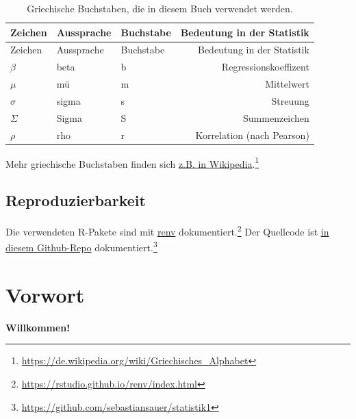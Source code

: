 \documentclass[
  a4paper,
]{scrbook}
\theoremstyle{definition}
\theoremstyle{definition}
\theoremstyle{definition}
\theoremstyle{remark}
\begin{document}
\begin{longtable}[]{@{}lllr@{}}
\caption{Griechische Buchstaben, die in diesem Buch verwendet
werden.}\label{tbl-griech}\tabularnewline
\toprule\noalign{}
Zeichen & Aussprache & Buchstabe & Bedeutung in der Statistik \\
\midrule\noalign{}
\endfirsthead
\toprule\noalign{}
Zeichen & Aussprache & Buchstabe & Bedeutung in der Statistik \\
\midrule\noalign{}
\endhead
\bottomrule\noalign{}
\endlastfoot
\(\beta\) & beta & b & Regressionskoeffizent \\
\(\mu\) & mü & m & Mittelwert \\
\(\sigma\) & sigma & s & Streuung \\
\(\Sigma\) & Sigma & S & Summenzeichen \\
\(\rho\) & rho & r & Korrelation (nach Pearson) \\
\end{longtable}

Mehr griechische Buchstaben finden sich
\href{https://de.wikipedia.org/wiki/Griechisches_Alphabet}{z.B. in
Wikipedia}.\footnote{\url{https://de.wikipedia.org/wiki/Griechisches_Alphabet}}

\section{Reproduzierbarkeit}\label{reproduzierbarkeit}

Die verwendeten R-Pakete sind mit
\href{https://rstudio.github.io/renv/index.html}{renv}
dokumentiert.\footnote{\url{https://rstudio.github.io/renv/index.html}}
Der Quellcode ist \href{https://github.com/sebastiansauer/statistik1}{in
diesem Github-Repo} dokumentiert.\footnote{\url{https://github.com/sebastiansauer/statistik1}}


\chapter*{Vorwort}\label{vorwort}


\textbf{Willkommen!}
\end{document}

